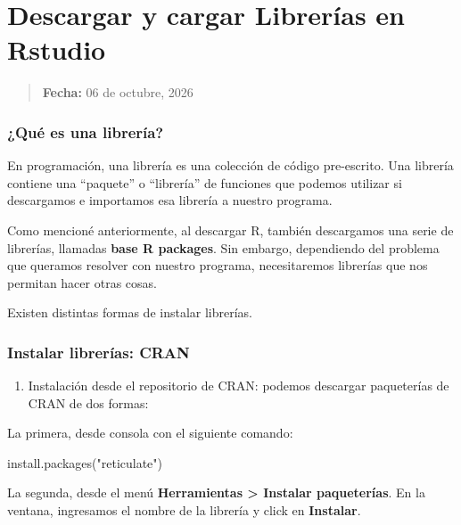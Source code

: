 \documentclass[
  spanish,
  12pt,
  letterpaper,
  DIV=11,
  numbers=noendperiod]{scrreprt}
\newenvironment{Shaded}{\begin{snugshade}}{\end{snugshade}}
\newcommand{\FunctionTok}[1]{\textcolor[rgb]{0.28,0.35,0.67}{#1}}
\newcommand{\NormalTok}[1]{\textcolor[rgb]{0.00,0.23,0.31}{#1}}
\newcommand{\StringTok}[1]{\textcolor[rgb]{0.13,0.47,0.30}{#1}}
\providecommand{\tightlist}{%
  \setlength{\itemsep}{0pt}\setlength{\parskip}{0pt}}
\begin{document}
\chapter{Descargar y cargar Librerías en
Rstudio}\label{descargar-y-cargar-libreruxedas-en-rstudio}

\begin{quote}
\textbf{Fecha:} 06 de octubre, 2026
\end{quote}

\subsection{¿Qué es una librería?}\label{quuxe9-es-una-libreruxeda}

En programación, una librería es una colección de código pre-escrito.
Una librería contiene una ``paquete'' o ``librería'' de funciones que
podemos utilizar si descargamos e importamos esa librería a nuestro
programa.

Como mencioné anteriormente, al descargar R, también descargamos una
serie de librerías, llamadas \textbf{base R packages}. Sin embargo,
dependiendo del problema que queramos resolver con nuestro programa,
necesitaremos librerías que nos permitan hacer otras cosas.

Existen distintas formas de instalar librerías.

\subsection{Instalar librerías: CRAN}\label{instalar-libreruxedas-cran}

\begin{enumerate}
\def\labelenumi{\arabic{enumi}.}
\tightlist
\item
  Instalación desde el repositorio de CRAN: podemos descargar
  paqueterías de CRAN de dos formas:
\end{enumerate}

La primera, desde consola con el siguiente comando:

\begin{Shaded}
\begin{Highlighting}[]
\FunctionTok{install.packages}\NormalTok{(}\StringTok{"reticulate"}\NormalTok{)}
\end{Highlighting}
\end{Shaded}

La segunda, desde el menú \textbf{Herramientas \textgreater{} Instalar
paqueterías}. En la ventana, ingresamos el nombre de la librería y click
en \textbf{Instalar}.
\end{document}
